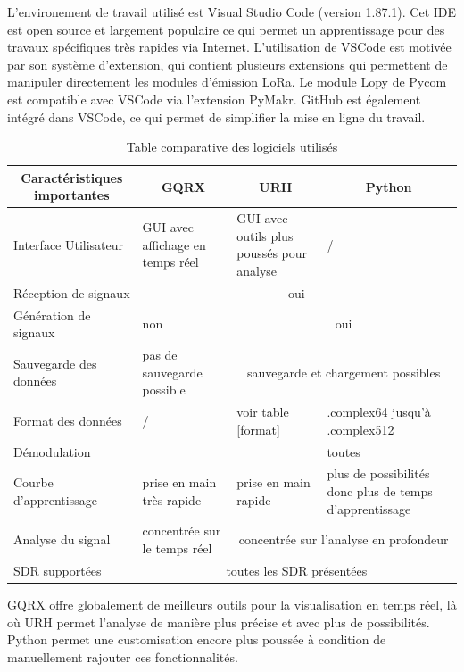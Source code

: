 \newpage

L'environement de travail utilisé est Visual Studio Code (version 1.87.1). Cet IDE est open source et largement populaire ce qui permet un apprentissage pour des travaux spécifiques très rapides via Internet. L'utilisation de VSCode est motivée par son système d'extension, qui contient plusieurs extensions qui permettent de manipuler directement les modules d'émission LoRa. Le module Lopy de Pycom est compatible avec VSCode via l'extension PyMakr. GitHub est également intégré dans VSCode, ce qui permet de simplifier la mise en ligne du travail.

\begin{table}[h]
\centering
\begin{tabular}{|p{4cm}|p{2cm}|p{2cm}|p{3.5cm}|}
\hline
\multicolumn{1}{|c|}{Caractéristiques importantes} & \multicolumn{1}{c|}{GQRX} & \multicolumn{1}{c|}{URH} & \multicolumn{1}{c|}{Python}\\
\hline
Interface Utilisateur & GUI avec affichage en temps réel & GUI avec outils plus poussés pour analyse & / \\
\hline
Réception de signaux & \multicolumn{3}{c|}{oui} \\
\hline
Génération de signaux & non & \multicolumn{2}{c|}{oui} \\
\hline
Sauvegarde des données & pas de sauvegarde possible & \multicolumn{2}{c|}{sauvegarde et chargement possibles} \\
\hline
Format des données & / & voir table \ref{format} & .complex64 jusqu'à .complex512 \\
\hline
Démodulation &  &  & toutes\\
\hline
Courbe d'apprentissage & prise en main très rapide & prise en main rapide & plus de possibilités donc plus de temps d'apprentissage \\
\hline
Analyse du signal & concentrée sur le temps réel & \multicolumn{2}{c|}{concentrée sur l'analyse en profondeur} \\
\hline
SDR supportées & \multicolumn{3}{c|}{toutes les SDR présentées} \\
\hline
\end{tabular}
\caption{Table comparative des logiciels utilisés}
\label{table2}
\end{table}

GQRX offre globalement de meilleurs outils pour la visualisation en temps réel, là où URH permet l'analyse de manière plus précise et avec plus de possibilités. Python permet une customisation encore plus poussée à condition de manuellement rajouter ces fonctionnalités.

